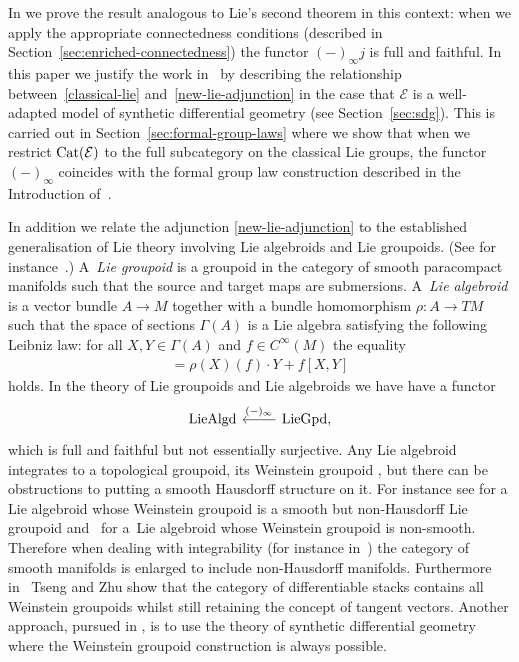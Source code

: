 \documentclass[pdftex]{sigma}
\numberwithin{equation}{section}
\begin{document}
In \cite{burke-relative-to-local-models} we prove the result analogous to Lie's second theorem in this context: when we apply the appropriate connectedness conditions (described in Section~\ref{sec:enriched-connectedness}) the functor $(-)_{\infty}j$ is full and faithful. In this paper we justify the work in~\cite{burke-relative-to-local-models} by describing the relationship between~\eqref{classical-lie} and~\eqref{new-lie-adjunction} in the case that $\mathcal{E}$ is a well-adapted model of synthetic dif\/ferential geometry (see Section~\ref{sec:sdg}). This is carried out in Section~\ref{sec:formal-group-laws} where we show that when we restrict ${\rm Cat}(\mathcal{E})$ to the full subcategory on the classical Lie groups, the functor $(-)_{\infty}$ coincides with the formal group law construction described in the Introduction of~\cite{MR506881}.

In addition we relate the adjunction \eqref{new-lie-adjunction} to the established generalisation of Lie theory involving Lie algebroids and Lie groupoids. (See for instance~\cite{MR2157566}.) A~\emph{Lie groupoid} is a groupoid in the category of smooth paracompact manifolds such that the source and target maps are submersions. A~\emph{Lie algebroid} is a vector bundle $A \rightarrow M$ together with a bundle homomorphism $\rho\colon A \rightarrow TM$ such that the space of sections $\Gamma(A)$ is a Lie algebra satisfying the following Leibniz law: for all $X,Y\in \Gamma(A)$ and $f\in C^{\infty}(M)$ the equality
\begin{gather*}[X,fY]=\rho(X)(f)\cdot Y+f[X,Y]\end{gather*}
holds.
In the theory of Lie groupoids and Lie algebroids we have have a functor
\begin{equation*}
\begin{tikzcd}
 {\rm LieAlgd} & {\rm LieGpd}, \lar[swap]{(-)_{\infty}}
\end{tikzcd}
\end{equation*}
which is full and faithful but not essentially surjective. Any Lie algebroid integrates to a topological groupoid, its Weinstein groupoid \cite{MR1973056}, but there can be obstructions to putting a smooth Hausdorf\/f structure on it. For instance see \cite{MR0197622} for a Lie algebroid whose Weinstein groupoid is a smooth but non-Hausdorf\/f Lie groupoid and~\cite{MR778785} for a~Lie algebroid whose Weinstein groupoid is non-smooth. Therefore when dealing with integrability (for instance in~\cite{MR1973056}) the category of smooth manifolds is enlarged to include non-Hausdorf\/f manifolds. Furthermore in~\cite{2006HsianHuaTsengandChenchangZhu22} Tseng and Zhu show that the category of dif\/ferentiable stacks contains all Weinstein groupoids whilst still retaining the concept of tangent vectors. Another approach, pursued in \cite{burke-relative-to-local-models}, is to use the theory of synthetic dif\/ferential geometry where the Weinstein groupoid construction is always possible.
\end{document}
